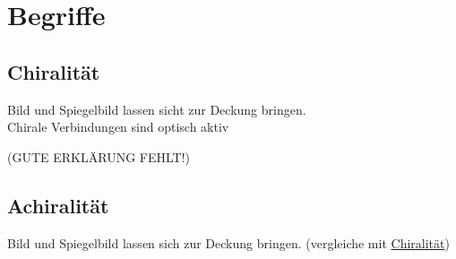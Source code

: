 
\section{Begriffe} \label{sec:begriffe}


\subsection{Chiralität} \label{sec:chiral}
Bild und Spiegelbild lassen sicht zur Deckung bringen. \\
Chirale Verbindungen sind optisch aktiv 

(GUTE ERKLÄRUNG FEHLT!)

\subsection{Achiralität}
Bild und Spiegelbild lassen sich zur Deckung bringen. (vergleiche mit \hyperref[sec:chiral]{Chiralität})

